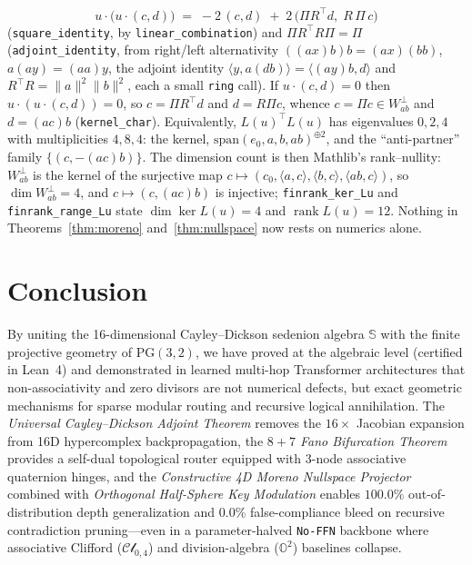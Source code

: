 \documentclass[11pt,a4paper]{article}
\theoremstyle{definition}
\theoremstyle{remark}
\newcommand{\Oc}{\mathbb{O}}
\newcommand{\Se}{\mathbb{S}}
\newcommand{\PG}{\mathrm{PG}}
\begin{document}
\[
u \cdot \big(u \cdot (c, d)\big) \;=\; -2\,(c, d) \;+\; 2\,\big(\Pi R^{\top} d,\; R\,\Pi\, c\big)
\]
(\texttt{square\_identity}, by \texttt{linear\_combination}) and $\Pi R^{\top} R \Pi = \Pi$ (\texttt{adjoint\_identity}, from right/left alternativity $((ax)b)b = (ax)(bb)$, $a(ay) = (aa)y$, the adjoint identity $\langle y, a(db) \rangle = \langle (ay)b, d \rangle$ and $R^{\top}R = \|a\|^2 \|b\|^2$, each a small \texttt{ring} call). If $u \cdot (c, d) = 0$ then $u \cdot (u \cdot (c,d)) = 0$, so $c = \Pi R^{\top} d$ and $d = R \Pi c$, whence $c = \Pi c \in W_{ab}^\perp$ and $d = (ac)b$ (\texttt{kernel\_char}). Equivalently, $L(u)^{\top} L(u)$ has eigenvalues $0, 2, 4$ with multiplicities $4, 8, 4$: the kernel, $\mathrm{span}(e_0, a, b, ab)^{\oplus 2}$, and the ``anti-partner'' family $\{(c, -(ac)b)\}$. The dimension count is then Mathlib's rank--nullity: $W_{ab}^\perp$ is the kernel of the surjective map $c \mapsto (c_0, \langle a, c \rangle, \langle b, c \rangle, \langle ab, c \rangle)$, so $\dim W_{ab}^\perp = 4$, and $c \mapsto (c, (ac)b)$ is injective; \texttt{finrank\_ker\_Lu} and \texttt{finrank\_range\_Lu} state $\dim \ker L(u) = 4$ and $\operatorname{rank} L(u) = 12$. Nothing in Theorems~\ref{thm:moreno} and~\ref{thm:nullspace} now rests on numerics alone.

\section{Conclusion}
\label{sec:conclusion}

By uniting the 16-dimensional Cayley--Dickson sedenion algebra $\Se$ with the finite projective geometry of $\PG(3,2)$, we have proved at the algebraic level (certified in Lean~4) and demonstrated in learned multi-hop Transformer architectures that non-associativity and zero divisors are not numerical defects, but exact geometric mechanisms for sparse modular routing and recursive logical annihilation. The \textit{Universal Cayley--Dickson Adjoint Theorem} removes the $16\times$ Jacobian expansion from 16D hypercomplex backpropagation, the \textit{$8+7$ Fano Bifurcation Theorem} provides a self-dual topological router equipped with 3-node associative quaternion hinges, and the \textit{Constructive 4D Moreno Nullspace Projector} combined with \textit{Orthogonal Half-Sphere Key Modulation} enables $100.0\%$ out-of-distribution depth generalization and $0.0\%$ false-compliance bleed on recursive contradiction pruning---even in a parameter-halved \texttt{No-FFN} backbone \cite{Ji2026CliffordNet} where associative Clifford ($\mathcal{Cl}_{0,4}$) and division-algebra ($\Oc^2$) baselines collapse.
\end{document}
